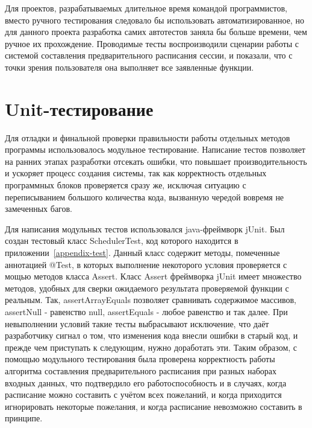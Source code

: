 Для проектов, разрабатываемых длительное время командой программистов, вместо ручного тестирования следовало бы использовать автоматизированное, но для данного проекта разработка самих автотестов заняла бы больше времени, чем ручное их прохождение. Проводимые тесты воспроизводили сценарии работы с системой составления предварительного расписания сессии, и показали, что с точки зрения пользователя она выполняет все заявленные функции.

\section{Unit-тестирование} \label{ch4:sec2}

Для отладки и финальной проверки правильности работы отдельных методов программы использовалось модульное тестирование. Написание тестов позволяет на ранних этапах разработки отсекать ошибки, что повышает производительность и ускоряет процесс создания системы, так как корректность отдельных программных блоков проверяется сразу же, исключая ситуацию с переписыванием большого количества кода, вызванную чередой вовремя не замеченных багов.

Для написания модульных тестов использовался java-фреймворк jUnit. Был создан тестовый класс SchedulerTest, код которого находится в приложении~\ref{appendix-test}. Данный класс содержит методы, помеченные аннотацией @Test, в которых выполнение некоторого условия проверяется с мощью методов класса Assert. Класс Assert фреймворка jUnit имеет множество методов, удобных для сверки ожидаемого результата проверяемой функции с реальным. Так, assertArrayEquals позволяет сравнивать содержимое массивов, assertNull - равенство null, assertEquals - любое равенство и так далее. При невыполнении условий такие тесты выбрасывают исключение, что даёт разработчику сигнал о том, что изменения кода внесли ошибки в старый код, и прежде чем приступать к следующим, нужно доработать эти. Таким образом, с помощью модульного тестирования была проверена корректность работы алгоритма составления предварительного расписания при разных наборах входных данных, что подтвердило его работоспособность и в случаях, когда расписание можно составить с учётом всех пожеланий, и когда приходится игнорировать некоторые пожелания, и когда расписание невозможно составить в принципе. 

